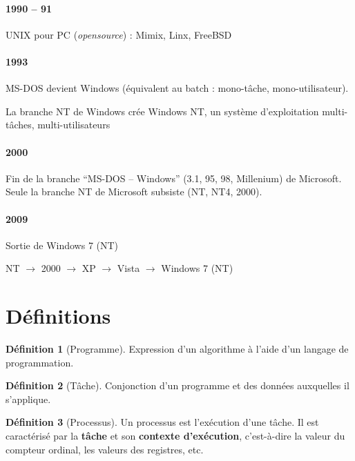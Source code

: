 \documentclass[11pt,english,french]{scrreprt}
\theoremstyle{remark}
\theoremstyle{definition}
\newtheorem*{def*}{Définition}
\begin{document}
\paragraph{1990 -- 91} %
UNIX pour PC (\emph{opensource}) : Mimix, Linx, FreeBSD


\paragraph{1993} %
MS-DOS devient Windows (équivalent au batch : mono-tâche, mono-utilisateur).

La branche NT de Windows crée Windows NT, un système d'exploitation multi-tâches, multi-utilisateurs

\paragraph{2000} %
Fin de la branche ``MS-DOS -- Windows'' (3.1, 95, 98, Millenium) de Microsoft. Seule la branche NT de Microsoft subsiste (NT, NT4, 2000).

\paragraph{2009} %
Sortie de Windows 7 (NT)

NT $\rightarrow$ 2000 $\rightarrow$ XP $\rightarrow$ Vista $\rightarrow$ Windows 7 (NT)

\section{Définitions}

\begin{def*}[Programme]
	Expression d'un algorithme à l'aide d'un langage de programmation.
\end{def*}

\begin{def*}[Tâche]
	Conjonction d'un programme et des données auxquelles il s'applique.
\end{def*}

\begin{def*}[Processus]
	Un processus est l'exécution d'une tâche. Il est caractérisé par la \textbf{tâche} et son \textbf{contexte d'exécution}, c'est-à-dire la valeur du compteur ordinal, les valeurs des registres, etc.
\end{def*}
\end{document}
